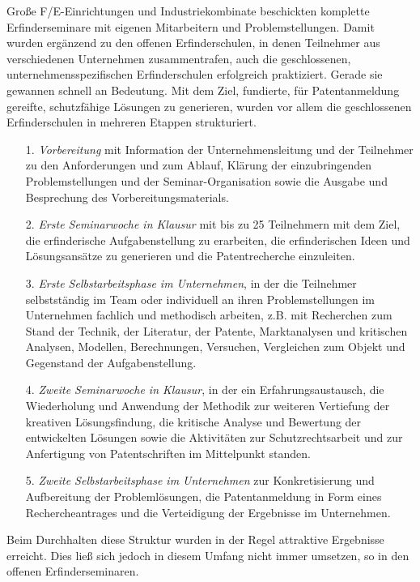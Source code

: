 \documentclass[11pt,a4paper]{article}
\begin{document}
Große F/E-Einrichtungen und Industriekombinate beschickten komplette
Erfinderseminare mit eigenen Mitarbeitern und Problemstellungen. Damit wurden
ergänzend zu den offenen Erfinderschulen, in denen Teilnehmer aus
verschiedenen Unternehmen zusammentrafen, auch die geschlossenen,
unternehmensspezifischen Erfinderschulen erfolgreich praktiziert. Gerade sie
gewannen schnell an Bedeutung. Mit dem Ziel, fundierte, für Patentanmeldung
gereifte, schutzfähige Lösungen zu generieren, wurden vor allem die
geschlossenen Erfinderschulen in mehreren Etappen strukturiert.
\begin{itemize}
\item[1.] \emph{Vorbereitung} mit Information der Unternehmensleitung und der
  Teilnehmer zu den Anforderungen und zum Ablauf, Klärung der einzubringenden
  Problemstellungen und der Seminar-Organisation sowie die Ausgabe und
  Besprechung des Vorbereitungsmaterials.
\item[2.] \emph{Erste Seminarwoche in Klausur} mit bis zu 25 Teilnehmern mit
  dem Ziel, die erfinderische Aufgabenstellung zu erarbeiten, die
  erfinderischen Ideen und Lösungsansätze zu generieren und die
  Patentrecherche einzuleiten.
\item[3.] \emph{Erste Selbstarbeitsphase im Unternehmen}, in der die
  Teilnehmer selbstständig im Team oder individuell an ihren Problemstellungen
  im Unternehmen fachlich und methodisch arbeiten, z.B. mit Recherchen zum
  Stand der Technik, der Literatur, der Patente, Marktanalysen und kritischen
  Analysen, Modellen, Berechnungen, Versuchen, Vergleichen zum Objekt und
  Gegenstand der Aufgabenstellung.
\item[4.] \emph{Zweite Seminarwoche in Klausur}, in der ein
  Erfahrungsaustausch, die Wiederholung und Anwendung der Methodik zur
  weiteren Vertiefung der kreativen Lösungsfindung, die kritische Analyse und
  Bewertung der entwickelten Lösungen sowie die Aktivitäten zur
  Schutzrechtsarbeit und zur Anfertigung von Patentschriften im Mittelpunkt
  standen.
\item[5.] \emph{Zweite Selbstarbeitsphase im Unternehmen} zur Konkretisierung
  und Aufbereitung der Problemlösungen, die Patentanmeldung in Form eines
  Rechercheantrages und die Verteidigung der Ergebnisse im Unternehmen.
\end{itemize}
Beim Durchhalten diese Struktur wurden in der Regel attraktive Ergebnisse
erreicht. Dies ließ sich jedoch in diesem Umfang nicht immer umsetzen, so in
den offenen Erfinderseminaren. 
   
\end{document}
